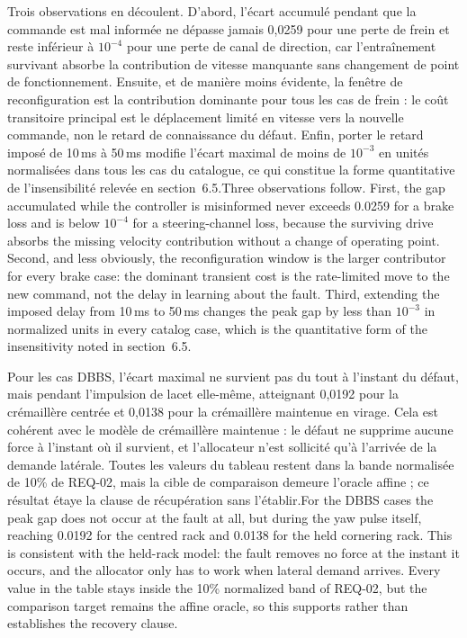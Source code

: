 \documentclass[11pt,a4paper,oneside]{report}
\newcommand{\bi}[2]{\iffrench #2\else #1\fi}
\begin{document}
\bi{Three observations follow. First, the gap accumulated while the controller is misinformed never exceeds 0.0259 for a brake loss and is below $10^{-4}$ for a steering-channel loss, because the surviving drive absorbs the missing velocity contribution without a change of operating point. Second, and less obviously, the reconfiguration window is the larger contributor for every brake case: the dominant transient cost is the rate-limited move to the new command, not the delay in learning about the fault. Third, extending the imposed delay from 10\,ms to 50\,ms changes the peak gap by less than $10^{-3}$ in normalized units in every catalog case, which is the quantitative form of the insensitivity noted in section~6.5.}{Trois observations en découlent. D'abord, l'écart accumulé pendant que la commande est mal informée ne dépasse jamais 0,0259 pour une perte de frein et reste inférieur à $10^{-4}$ pour une perte de canal de direction, car l'entraînement survivant absorbe la contribution de vitesse manquante sans changement de point de fonctionnement. Ensuite, et de manière moins évidente, la fenêtre de reconfiguration est la contribution dominante pour tous les cas de frein : le coût transitoire principal est le déplacement limité en vitesse vers la nouvelle commande, non le retard de connaissance du défaut. Enfin, porter le retard imposé de 10\,ms à 50\,ms modifie l'écart maximal de moins de $10^{-3}$ en unités normalisées dans tous les cas du catalogue, ce qui constitue la forme quantitative de l'insensibilité relevée en section~6.5.}

\bi{For the DBBS cases the peak gap does not occur at the fault at all, but during the yaw pulse itself, reaching 0.0192 for the centred rack and 0.0138 for the held cornering rack. This is consistent with the held-rack model: the fault removes no force at the instant it occurs, and the allocator only has to work when lateral demand arrives. Every value in the table stays inside the 10\% normalized band of REQ-02, but the comparison target remains the affine oracle, so this supports rather than establishes the recovery clause.}{Pour les cas DBBS, l'écart maximal ne survient pas du tout à l'instant du défaut, mais pendant l'impulsion de lacet elle-même, atteignant 0,0192 pour la crémaillère centrée et 0,0138 pour la crémaillère maintenue en virage. Cela est cohérent avec le modèle de crémaillère maintenue : le défaut ne supprime aucune force à l'instant où il survient, et l'allocateur n'est sollicité qu'à l'arrivée de la demande latérale. Toutes les valeurs du tableau restent dans la bande normalisée de 10\% de REQ-02, mais la cible de comparaison demeure l'oracle affine ; ce résultat étaye la clause de récupération sans l'établir.}
\end{document}
